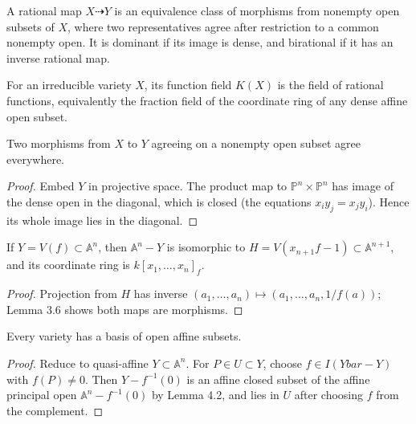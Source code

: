 \begin{definition}
\label{def:ha-ch1-rational-map}
A rational map $X\dashrightarrow Y$ is an equivalence class of morphisms from nonempty open
subsets of $X$, where two representatives agree after restriction to a common nonempty open.
It is dominant if its image is dense, and birational if it has an inverse rational map.
\end{definition}

\begin{definition}
\label{def:ha-ch1-function-field}
For an irreducible variety $X$, its function field $K(X)$ is the field of rational functions,
equivalently the fraction field of the coordinate ring of any dense affine open subset.
\end{definition}

\begin{lemma}
\label{lem:ha-ch1-4-1}
Two morphisms from $X$ to $Y$ agreeing on a nonempty open subset agree everywhere.
\end{lemma}
\begin{proof}
Embed $Y$ in projective space.  The product map to $\mathbb P^n\times\mathbb P^n$ has image of
the dense open in the diagonal, which is closed (the equations $x_i y_j=x_j y_i$).  Hence its
whole image lies in the diagonal.
\end{proof}

\begin{lemma}
\label{lem:ha-ch1-4-2}
If $Y=V(f)\subset\mathbb A^n$, then $\mathbb A^n-Y$ is isomorphic to
$H=V(x_{n+1}f-1)\subset\mathbb A^{n+1}$, and its coordinate ring is $k[x_1,\ldots,x_n]_f$.
\end{lemma}
\begin{proof}
Projection from $H$ has inverse $(a_1,\ldots,a_n)\mapsto(a_1,\ldots,a_n,1/f(a))$; Lemma 3.6
shows both maps are morphisms.
\end{proof}

\begin{proposition}
\label{prop:ha-ch1-4-3}
Every variety has a basis of open affine subsets.
\end{proposition}
\begin{proof}
Reduce to quasi-affine $Y\subset\mathbb A^n$.  For $P\in U\subset Y$, choose $f\in I(Ybar-Y)$
with $f(P)\ne0$.  Then $Y-f^{-1}(0)$ is an affine closed subset of the affine principal open
$\mathbb A^n-f^{-1}(0)$ by Lemma 4.2, and lies in $U$ after choosing $f$ from the complement.
\end{proof}

